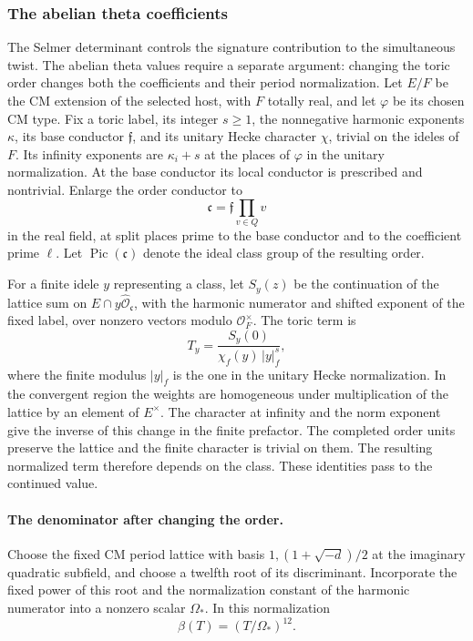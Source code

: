 \subsubsection*{The abelian theta coefficients}
\label{subsec:toric-twist}
\hypertarget{source-toric-twist}{}

The Selmer determinant controls the signature contribution to the simultaneous twist. The abelian theta values require a separate argument: changing the toric order changes both the coefficients and their period normalization. Let \(E/F\) be the CM extension of the
selected host, with \(F\) totally real, and let \(\varphi\)
be its chosen CM type. Fix a toric label, its integer
\(s\ge1\), the nonnegative harmonic exponents \(\kappa\),
its base conductor \(\mathfrak f\), and its unitary Hecke
character \(\chi\), trivial on the ideles of \(F\).
Its infinity exponents are \(\kappa_i+s\) at the places
of \(\varphi\) in the unitary normalization. At the base
conductor its local conductor is prescribed and nontrivial.
Enlarge the order conductor to
\[
 \mathfrak c=\mathfrak f\prod_{v\in Q}v
\]
in the real
field, at split places prime to the base conductor and to
the coefficient prime \(\ell\).
Let \(\operatorname{Pic}(\mathfrak c)\) denote the
ideal class group of the resulting order.

For a finite idele \(y\) representing a class, let
\(S_y(z)\) be the continuation of the lattice sum on
\(E\cap y\widehat{\mathcal O}_{\mathfrak c}\), with the
harmonic numerator and shifted exponent of the fixed label,
over nonzero vectors modulo \(\mathcal O_F^\times\).
The toric term is
\[
       T_y=\frac{S_y(0)}
          {\chi_f(y)\,|y|_f^{s}},
\]
where the finite modulus \(|y|_f\) is the one in the
unitary Hecke normalization. In the convergent region the
weights are homogeneous under
multiplication of the lattice by an element of \(E^\times\).
The character at infinity and the norm exponent give
the inverse of this change in the finite prefactor.
The completed order units preserve the lattice and
the finite character is trivial on them. The resulting
normalized term therefore depends on the class. These
identities pass to the continued value.

\paragraph{The denominator after changing the order.}
Choose the fixed CM period lattice with basis
\(1,(1+\sqrt{-d})/2\) at the imaginary quadratic subfield,
and choose a twelfth root of its discriminant. Incorporate the
fixed power of this root and the normalization constant
of the harmonic numerator into a nonzero scalar
\(\Omega_*\). In this normalization
\[
 \beta(T)=(T/\Omega_*)^{12}.
\]

